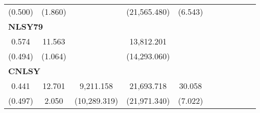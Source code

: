\begin{tabular}{ccccccccccc}
    (0.500) &     (1.860) &      & (21,565.480) &     (6.543) &         &         &         &         &          \\  
\multicolumn{10}{l}{\textbf{NLSY79}} \\    
    0.574 &    11.563 &   & 13,812.201 &  &         &         &         &         &          \\  
    (0.494) &     (1.064) &   & (14,293.060) & &         &         &         &         &         \\  
\multicolumn{10}{l}{\textbf{CNLSY}} \\
    0.441 &    12.701 &  9,211.158 & 21,693.718 &    30.058 &         &         &         &         &         \\  
    (0.497) &     2.050 & (10,289.319) & (21,971.340) &     (7.022) &         &         &         &         &          \\ \bottomrule \end{tabular}


